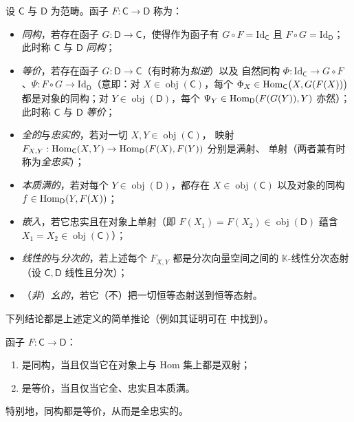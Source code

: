 \begin{Def}\label{def:2.2}
设 $\mathsf C$ 与 $\mathsf D$ 为范畴。函子 $F:\mathsf C\to\mathsf D$ 称为：
\begin{itemize}
  \item \emph{同构}，若存在函子 $G:\mathsf D\to\mathsf C$，使得作为函子有
        $G\circ F=\mathrm{Id}_{\mathsf C}$ 且 $F\circ G=\mathrm{Id}_{\mathsf D}$；
        此时称 $\mathsf C$ 与 $\mathsf D$ \emph{同构}；
  \item \emph{等价}，若存在函子 $G:\mathsf D\to\mathsf C$（有时称为\emph{拟逆}）以及
        自然同构 $\Phi:\mathrm{Id}_{\mathsf C}\to G\circ F$、$\Psi:F\circ G\to
        \mathrm{Id}_{\mathsf D}$（意即：对 $X\in\operatorname{obj}(\mathsf C)$，每个
        $\Phi_X\in\operatorname{Hom}_{\mathsf C}\bigl(X,G(F(X))\bigr)$ 都是对象的同构；对
        $Y\in\operatorname{obj}(\mathsf D)$，每个 $\Psi_Y\in
        \operatorname{Hom}_{\mathsf D}(F(G(Y)),Y)$ 亦然）；此时称 $\mathsf C$ 与 $\mathsf D$
        \emph{等价}；
  \item \emph{全的}与\emph{忠实的}，若对一切 $X,Y\in\operatorname{obj}(\mathsf C)$，
        映射 $F_{X,Y}:\operatorname{Hom}_{\mathsf C}(X,Y)\to\operatorname{Hom}_{\mathsf D}(F(X),F(Y))$ 分别是满射、
        单射（两者兼有时称为\emph{全忠实}）；
  \item \emph{本质满的}，若对每个 $Y\in\operatorname{obj}(\mathsf D)$，都存在
        $X\in\operatorname{obj}(\mathsf C)$ 以及对象的同构
        $f\in\operatorname{Hom}_{\mathsf D}(Y,F(X))$；
  \item \emph{嵌入}，若它忠实且在对象上单射（即 $F(X_1)=F(X_2)\in
        \operatorname{obj}(\mathsf D)$ 蕴含 $X_1=X_2\in\operatorname{obj}(\mathsf C)$）；
  \item \emph{线性的}与\emph{分次的}，若上述每个 $F_{X,Y}$ 都是分次向量空间之间的
        $\mathbb K$-线性分次态射（设 $\mathsf C,\mathsf D$ 线性且分次）；
  \item （\emph{非}）\emph{幺的}，若它（不）把一切恒等态射送到恒等态射。
\end{itemize}
\end{Def}

下列结论都是上述定义的简单推论（例如其证明可在 \cite{GM03} 中找到）。

\begin{Lem}\label{lem:2.3}
函子 $F:\mathsf C\to\mathsf D$：
\begin{enumerate}
  \item 是同构，当且仅当它在对象上与 Hom 集上都是双射；
  \item 是等价，当且仅当它全、忠实且本质满。
\end{enumerate}
特别地，同构都是等价，从而是全忠实的。
\end{Lem}

